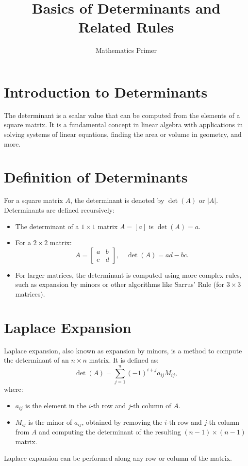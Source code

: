 \documentclass[a4paper,12pt]{article}
\title{Basics of Determinants and Related Rules}
\author{Mathematics Primer}
\date{}
\begin{document}
\maketitle

\section*{Introduction to Determinants}
The determinant is a scalar value that can be computed from the elements of a square matrix. It is a fundamental concept in linear algebra with applications in solving systems of linear equations, finding the area or volume in geometry, and more.

\section{Definition of Determinants}
For a square matrix $A$, the determinant is denoted by $\det(A)$ or $|A|$. Determinants are defined recursively:
\begin{itemize}
    \item The determinant of a $1 \times 1$ matrix $A = [a]$ is $\det(A) = a$.
    \item For a $2 \times 2$ matrix:
    \[
    A = \begin{bmatrix} a & b \\
    c & d \end{bmatrix}, \quad \det(A) = ad - bc.
    \]
    \item For larger matrices, the determinant is computed using more complex rules, such as expansion by minors or other algorithms like Sarrus' Rule (for $3 \times 3$ matrices).
\end{itemize}

\section{Laplace Expansion}
Laplace expansion, also known as expansion by minors, is a method to compute the determinant of an $n \times n$ matrix. It is defined as:
\[
\det(A) = \sum_{j=1}^{n} (-1)^{i+j} a_{ij} M_{ij},
\]
where:
\begin{itemize}
    \item $a_{ij}$ is the element in the $i$-th row and $j$-th column of $A$.
    \item $M_{ij}$ is the minor of $a_{ij}$, obtained by removing the $i$-th row and $j$-th column from $A$ and computing the determinant of the resulting $(n-1) \times (n-1)$ matrix.
\end{itemize}
Laplace expansion can be performed along any row or column of the matrix.
\end{document}
